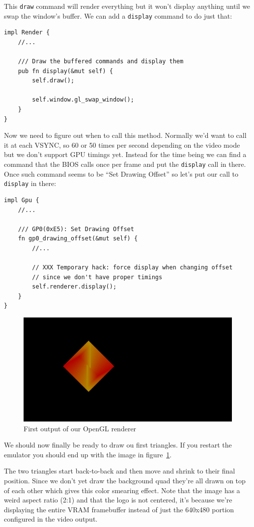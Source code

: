 \documentclass[a4paper]{article}
\newcommand{\code}[1] {\texttt{#1}}
\begin{document}
This \code{draw} command will render everything but it won't display
anything until we swap the window's buffer. We can add a
\code{display} command to do just that:

\begin{lstlisting}
impl Render {
    //...

    /// Draw the buffered commands and display them
    pub fn display(&mut self) {
        self.draw();

        self.window.gl_swap_window();
    }
}
\end{lstlisting}

Now we need to figure out when to call this method. Normally we'd want
to call it at each VSYNC, so 60 or 50 times per second depending on
the video mode but we don't support GPU timings yet. Instead for the
time being we can find a command that the BIOS calls once per frame
and put the \code{display} call in there. Once such command seems to
be ``Set Drawing Offset'' so let's put our call to \code{display} in
there:

\begin{lstlisting}
impl Gpu {
    //...

    /// GP0(0xE5): Set Drawing Offset
    fn gp0_drawing_offset(&mut self) {
        //...

        // XXX Temporary hack: force display when changing offset
        // since we don't have proper timings
        self.renderer.display();
    }
}
\end{lstlisting}

\begin{figure}[ht]
  \centering
  \includegraphics[width=\textwidth]{images/first-triangles}
  \caption{First output of our OpenGL renderer}
  \label{fig:renderer_first_triangles}
\end{figure}


We should now finally be ready to draw ou first triangles. If you
restart the emulator you should end up with the image in
figure~\ref{fig:renderer_first_triangles}.

The two triangles start back-to-back and then move and shrink to their
final position. Since we don't yet draw the background quad they're
all drawn on top of each other which gives this color smearing
effect. Note that the image has a weird aspect ratio (2:1) and that
the logo is not centered, it's because we're displaying the entire
VRAM framebuffer instead of just the 640x480 portion configured in the
video output.

\newpage

\listoftables
\listoffigures
\end{document}
